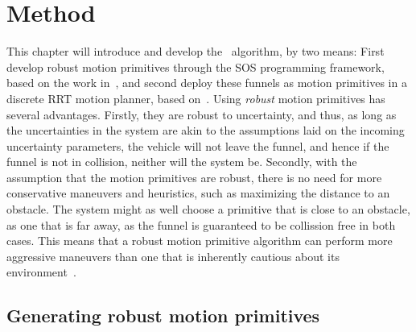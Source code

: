 \chapter{Method}

This chapter will introduce and develop the \rrtfunnel\ algorithm, by two means:
First develop robust motion primitives through the \ac{SOS} programming
framework, based on the work in~\cite{majumdarFunnelLibrariesRealtime2017}, and
second deploy these funnels as motion primitives in a discrete \ac{RRT} motion
planner, based on~\cite{lavalleLav98cPdf}. Using \textit{robust} motion
primitives has several advantages. Firstly, they are robust to uncertainty, and
thus, as long as the uncertainties in the system are akin to the assumptions
laid on the incoming uncertainty parameters, the vehicle will not leave the
funnel, and hence if the funnel is not in collision, neither will the system be.
Secondly, with the assumption that the motion primitives are robust, there is no
need for more conservative maneuvers and heuristics, such as maximizing the
distance to an obstacle. The system might as well choose a primitive that is
close to an obstacle, as one that is far away, as the funnel is guaranteed to be
collission free in both cases. This means that a robust motion primitive
algorithm can perform more aggressive maneuvers than one that is inherently
cautious about its environment~\cite{majumdarFunnelLibrariesRealtime2017}.

\section{Generating robust motion primitives}

